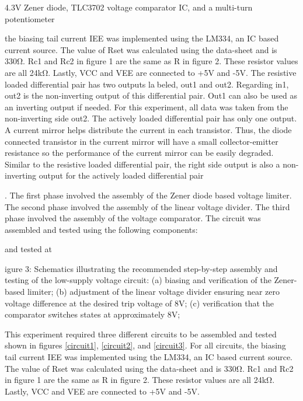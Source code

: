 \documentclass[conference]{IEEEtran}
\begin{document}
4.3V Zener diode, TLC3702 voltage comparator IC, and a multi-turn potentiometer


the biasing tail current IEE was implemented using
the LM334, an IC based current source. The value of Rset was
calculated using the data-sheet and is 330Ω. Rc1 and Rc2 in
figure 1 are the same as R in figure 2. These resistor values
are all 24kΩ. Lastly, VCC and VEE are connected to +5V and
-5V.
The resistive loaded differential pair has two outputs labeled, out1 and out2. Regarding in1, out2 is the non-inverting
output of this differential pair. Out1 can also be used as an
inverting output if needed. For this experiment, all data was
taken from the non-inverting side out2.
The actively loaded differential pair has only one output. A
current mirror helps distribute the current in each transistor.
Thus, the diode connected transistor in the current mirror will
have a small collector-emitter resistance so the performance
of the current mirror can be easily degraded. Similar to the
resistive loaded differential pair, the right side output is also
a non-inverting output for the actively loaded differential pair



. The first phase involved the assembly of the Zener diode based voltage limiter. The second phase involved the assembly of the linear voltage divider. The third phase involved the assembly of the voltage comparator. The circuit was assembled and tested using the following components:


and tested at 

igure 3: Schematics illustrating the recommended step-by-step assembly and testing of the low-supply voltage circuit: 
(a) biasing and verification of the Zener-based limiter; (b) adjustment of the linear voltage divider ensuring near zero 
voltage difference at the desired trip voltage of 8V; (c) verification that the comparator switches states at 
approximately 8V;

This experiment required three different circuits to be assembled and tested shown in figures \ref{circuit1}, \ref{circuit2}, and \ref{circuit3}. For all circuits, the biasing tail current IEE was implemented using the LM334, an IC based current source. The value of Rset was calculated using the data-sheet and is 330Ω. Rc1 and Rc2 in figure 1 are the same as R in figure 2. These resistor values are all 24kΩ. Lastly, VCC and VEE are connected to +5V and -5V.
\end{document}
